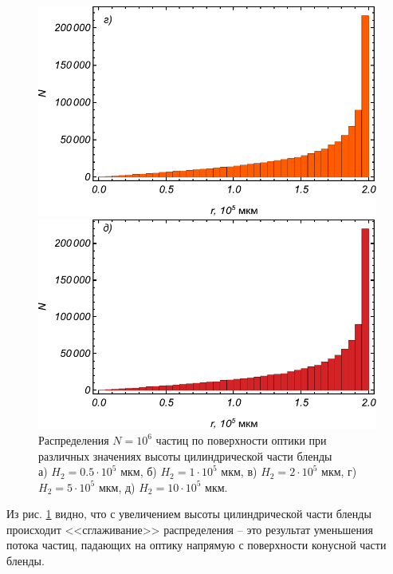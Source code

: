 \documentclass[
11pt,
master, %
subf, %
href, %
colorlinks=true, %
]{disser}
\begin{document}
\begin{figure}[htbp]
\begin{minipage}[h]{0.45\linewidth}
	\end{minipage}
	\hfill
	\begin{minipage}[h]{0.45\linewidth}
		\centering
		\includegraphics[width=1\linewidth]{hist_h2=5}
	\end{minipage}
	\vfill
	\begin{minipage}[h]{1\linewidth}
		\centering
		\includegraphics[width=0.45\linewidth]{hist_h2=10}
	\end{minipage}
	\vfill
	\caption{Распределения $N = 10^6$ частиц по поверхности оптики при различных значениях высоты цилиндрической части бленды \\
		а) $H_2 = 0.5 \cdot 10^5$ мкм, б) $H_2 = 1 \cdot 10^5$ мкм, в) $H_2 = 2 \cdot 10^5$ мкм, г) $H_2 = 5 \cdot 10^5$ мкм, д) $H_2 = 10 \cdot 10^5$ мкм.}
	\label{ris:6}
\end{figure}

Из рис. \ref{ris:6} видно, что с увеличением высоты цилиндрической части бленды происходит <<сглаживание>> распределения -- это результат уменьшения потока частиц, падающих на оптику напрямую с поверхности конусной части бленды.
\end{document}
